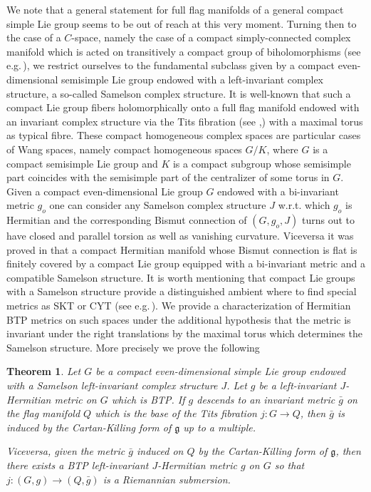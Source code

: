 \documentclass{amsart}
\numberwithin{equation}{section}
\newtheorem{theorem} {Theorem} [section]
\theoremstyle{definition}
\renewcommand{\1}{\mathds{1}}
\renewcommand{\gg}{\mathfrak g}
\renewcommand{\>}{\rightarrow}
\begin{document}
We note that a general statement for full flag manifolds of a general compact simple Lie group seems to be out of reach at this very moment. Turning then to the case of a $C$-space, namely the case of a compact simply-connected complex manifold which is acted on transitively a compact group of biholomorphisms (see e.g.\,\cite{A}), we restrict ourselves to the fundamental subclass given by a compact even-dimensional semisimple Lie group endowed with a left-invariant complex structure, a so-called Samelson complex structure. It is well-known that such a compact Lie group fibers holomorphically onto a full flag manifold endowed with an invariant complex structure via the Tits fibration (see \cite{A},\cite{Samelson}) with a maximal torus as typical fibre. These compact homogeneous complex spaces are  particular cases of Wang spaces, namely compact homogeneous spaces $G/K$, where $G$ is a compact semisimple Lie group and $K$ is a compact subgroup whose semisimple part coincides with the semisimple part of the centralizer of some torus in $G$. Given a compact even-dimensional Lie group $G$ endowed with a bi-invariant metric $g_o$ one can consider any Samelson complex structure $J$ w.r.t. which $g_o$ is Hermitian and the corresponding Bismut connection of $(G,g_o,J)$ turns out to have closed and parallel torsion as well as vanishing curvature. Viceversa it was proved in \cite{WYZ} that a compact Hermitian manifold whose Bismut connection is flat is finitely covered by a compact Lie group equipped with a bi-invariant metric and a compatible Samelson structure. It is worth mentioning that compact Lie groups with a Samelson structure provide a distinguished ambient where to find special metrics as SKT or CYT (see e.g.\,\cite{FG}). We provide a characterization of Hermitian BTP metrics on such spaces under the additional hypothesis that the metric is invariant under the right translations by the maximal torus which determines the Samelson structure. More precisely we prove the following
\begin{theorem}\label{Sam} Let $G$ be a compact even-dimensional simple Lie group endowed with a Samelson left-invariant complex structure $J$. Let $g$ be a left-invariant $J$-Hermitian metric on $G$ which is {\rm BTP}. If $g$ descends to an invariant metric $\bar g$  on the flag manifold $Q$ which is the base of the Tits fibration $j:G\to Q$, then $\bar g$ is induced by the Cartan-Killing form of $\gg$ up to a multiple. \par
Viceversa, given the metric $\bar g$ induced on $Q$ by the Cartan-Killing form of $\gg$, then there exists a {\rm BTP} left-invariant $J$-Hermitian metric $g$ on $G$ so that $j:(G,g)\to (Q,\bar g)$ is a Riemannian submersion.
\end{theorem}
\end{document}
